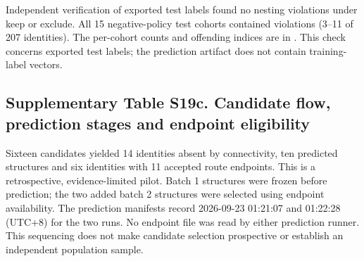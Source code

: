 Independent verification of exported test labels found no nesting violations under keep or exclude. All 15 negative-policy test cohorts contained violations (3--11 of 207 identities). The per-cohort counts and offending indices are in . This check concerns exported test labels; the prediction artifact does not contain training-label vectors.

\subsection*{Supplementary Table S19c. Candidate flow, prediction stages and endpoint eligibility}

Sixteen candidates yielded 14 identities absent by connectivity, ten predicted structures and six identities with 11 accepted route endpoints. This is a retrospective, evidence-limited pilot. Batch 1 structures were frozen before prediction; the two added batch 2 structures were selected using endpoint availability. The prediction manifests record 2026-09-23 01:21:07 and 01:22:28 (UTC+8) for the two runs. No endpoint file was read by either prediction runner. This sequencing does not make candidate selection prospective or establish an independent population sample.

\begingroup\footnotesize\setlength{\tabcolsep}{4pt}

